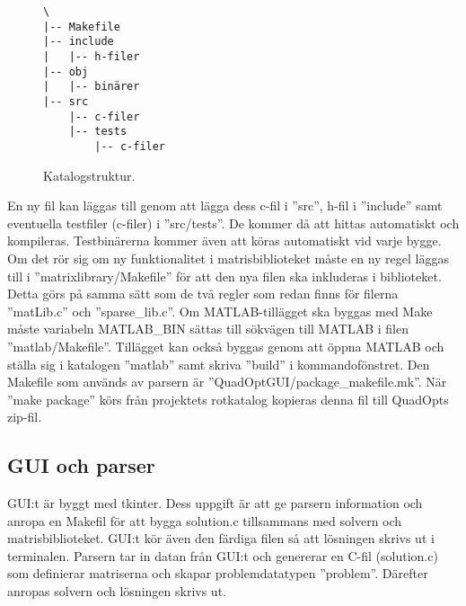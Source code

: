\begin{figure}[H]
  \centering
  \begin{verbatim}
\
|-- Makefile
|-- include
|   |-- h-filer
|-- obj
|   |-- binärer
|-- src
    |-- c-filer
    |-- tests
        |-- c-filer
  \end{verbatim}
  \caption{Katalogstruktur.}
  \label{fig:katalogstruktur}
\end{figure}

\noindent En ny fil kan läggas till genom att lägga dess c-fil i ''src'', h-fil i ''include'' samt eventuella testfiler (c-filer) i ''src/tests''. De kommer då att hittas automatiskt och kompileras. Testbinärerna kommer även att köras automatiskt vid varje bygge. Om det rör sig om ny funktionalitet i matrisbiblioteket måste en ny regel läggas till i ''matrixlibrary/Makefile'' för att den nya filen ska inkluderas i biblioteket. Detta görs på samma sätt som de två regler som redan finns för filerna ''matLib.c'' och ''sparse\_lib.c''.
\newline
\newline
Om MATLAB-tillägget ska byggas med Make måste variabeln MATLAB\_BIN sättas till sökvägen till MATLAB i filen ''matlab/Makefile''. Tillägget kan också byggas genom att öppna MATLAB och ställa sig i katalogen ''matlab'' samt skriva ''build'' i kommandofönstret.
\newline
\newline
Den Makefile som används av parsern är ''QuadOptGUI/package\_makefile.mk''. När ''make package'' körs från projektets rotkatalog kopieras denna fil till QuadOpts zip-fil.

\subsection{GUI och parser}
GUI:t är byggt med tkinter. Dess uppgift är att ge parsern information och anropa en Makefil för att bygga solution.c tillsammans med solvern och matrisbiblioteket. GUI:t kör även den färdiga filen så att lösningen skrivs ut i terminalen.
\newline
\newline
Parsern tar in datan från GUI:t och genererar en C-fil (solution.c) som definierar matriserna och skapar problemdatatypen ''problem''. Därefter anropas solvern och lösningen skrivs ut.
